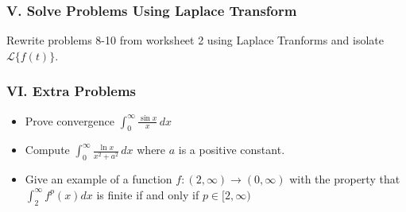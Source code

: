 \documentclass[12pt]{article}
\begin{document}
\subsubsection*{V. Solve Problems Using Laplace Transform}
Rewrite problems 8-10 from worksheet 2 using Laplace Tranforms and isolate $\mathcal{L}\{f(t)\}$.


\subsubsection*{VI. Extra Problems}
\begin{itemize}
    \item[\quad \textbf{a.}] Prove convergence $\displaystyle \int_{0}^{\infty} \frac{\sin{x}}{x} \, dx$
    \item[\quad \textbf{b.}]  Compute $\displaystyle \int_{0}^{\infty} \frac{\ln x}{x^2+a^2} \, dx$ where $a$ is a positive constant.
    \item[\quad \textbf{c.}] Give an example of a function $f: (2, \infty) \to (0, \infty)$  with the property that $\displaystyle \int_{2}^{\infty} f^p(x) dx$ is finite if and only if $p\in [2, \infty)$
\end{itemize}

\end{document}
